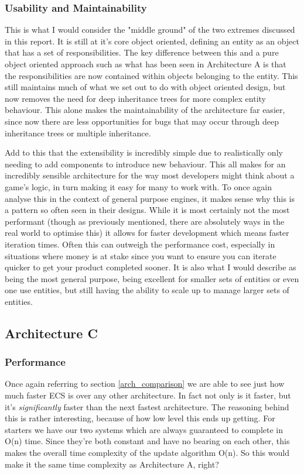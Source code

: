 \documentclass{article}
\begin{document}
\subsubsection{Usability and Maintainability}
This is what I would consider the "middle ground" of the two extremes discussed
in this report. It is still at it's core object oriented, defining an entity as
an object that has a set of responsibilities. The key difference between this
and a pure object oriented approach such as what has been seen in Architecture A
is that the responsibilities are now contained within objects belonging to the
entity. This still maintains much of what we set out to do with object oriented
design, but now removes the need for deep inheritance trees for more complex
entity behaviour. This alone makes the maintainability of the architecture far
easier, since now there are less opportunities for bugs that may occur through
deep inheritance trees or multiple inheritance.

Add to this that the extensibility is incredibly simple due to realistically
only needing to add components to introduce new behaviour. This all makes for
an incredibly sensible architecture for the way most developers might think
about a game's logic, in turn making it easy for many to work with. To once
again analyse this in the context of general purpose engines, it makes sense
why this is a pattern so often seen in their designs. While it is most certainly
not the most performant (though as previously mentioned, there are absolutely
ways in the real world to optimise this) it allows for faster development which
means faster iteration times. Often this can outweigh the performance cost,
especially in situations where money is at stake since you want to ensure you
can iterate quicker to get your product completed sooner. It is also what I
would describe as being the most general purpose, being excellent for smaller
sets of entities or even one use entities, but still having the ability to scale
up to manage larger sets of entities.

\subsection{Architecture C}
\subsubsection{Performance}
Once again referring to section \ref{arch_comparison} we are able to see just
how much faster ECS is over any other architecture. In fact not only is it
faster, but it's \textit{significantly} faster than the next fastest
architecture. The reasoning behind this is rather interesting, because of how
low level this ends up getting. For starters we have our two systems which are
always guaranteed to complete in O(n) time. Since they're both constant
and have no bearing on each other, this makes the overall time complexity of
the update algorithm O(n). So this would make it the same time complexity as
Architecture A, right?
\end{document}
